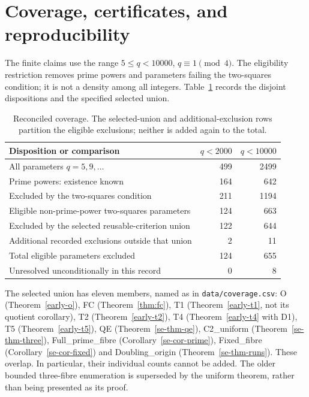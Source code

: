 \documentclass[11pt]{article}
\theoremstyle{definition}
\theoremstyle{remark}
\begin{document}
\section{Coverage, certificates, and reproducibility}\label{sec:coverage}
The finite claims use the range $5\le q<10000$, $q\equiv1\pmod4$.
The eligibility restriction removes prime powers and parameters failing
the two-squares condition; it is not a density among all integers.
Table~\ref{tab:coverage} records the disjoint dispositions and the
specified selected union.
\begin{table}[ht]
\centering
\begin{tabular}{lrr}
\toprule
Disposition or comparison & $q<2000$ & $q<10000$\\
\midrule
All parameters $q=5,9,\ldots$ &499&2499\\
Prime powers: existence known &164&642\\
Excluded by the two-squares condition &211&1194\\
Eligible non-prime-power two-squares parameters &124&663\\
Excluded by the selected reusable-criterion union &122&644\\
Additional recorded exclusions outside that union &2&11\\
Total eligible parameters excluded &124&655\\
Unresolved unconditionally in this record &0&8\\
\bottomrule
\end{tabular}
\caption{Reconciled coverage. The selected-union and additional-exclusion
rows partition the eligible exclusions; neither is added again to the
total.}\label{tab:coverage}
\end{table}

The selected union has eleven members, named as in \texttt{data/coverage.csv}:
O (Theorem~\ref{early-o}), FC (Theorem~\ref{thm:fc}), T1
(Theorem~\ref{early-t1}, not its quotient corollary), T2
(Theorem~\ref{early-t2}), T4 (Theorem~\ref{early-t4} with D1), T5
(Theorem~\ref{early-t5}), QE (Theorem~\ref{se-thm-qe}), C2\_uniform
(Theorem~\ref{se-thm-three}), Full\_prime\_fibre
(Corollary~\ref{se-cor-prime}), Fixed\_fibre (Corollary~\ref{se-cor-fixed})
and Doubling\_origin (Theorem~\ref{se-thm-runs}). These overlap. In particular, their
individual counts cannot be added. The older bounded three-fibre
enumeration is superseded by the uniform theorem, rather than being
presented as its proof.
\end{document}

